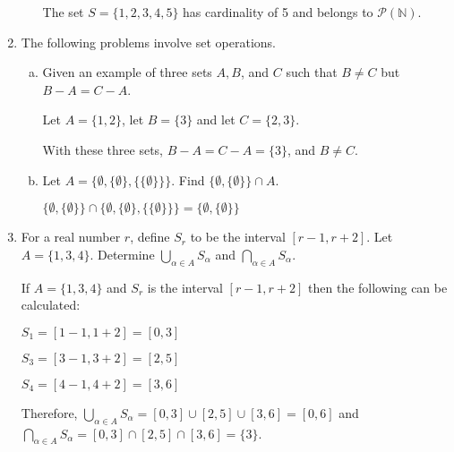 \documentclass[10pt]{article} %
\newcommand{\cP}{\mathcal{P}}
\newcommand{\N}{\mathbb{N}}
\begin{document}
\begin{enumerate}
\begin{enumerate}[(a)]
  \bigskip
  
    The set $S = \{1,2,3,4,5\}$ has cardinality of 5 and belongs to $\cP(\N)$.
  
  \bigskip
  
  \end{enumerate}

\item The following problems involve set operations.
  \begin{enumerate}[(a)]
  \item  Given an example of three sets $A, B$, and $C$ such that $B\not=C$ but $B-A=C-A$.
  
  \bigskip
  
    Let $A = \{1,2\}$, let $B = \{3\}$ and let $C = \{2,3\}$.  
  
  \noindent With these three sets, $B-A = C-A = \{3\}$, and $B \neq C$.  
  
  \bigskip
  
  \item Let $A=\{\emptyset, \{\emptyset\}, \{\{\emptyset\}\}\}$. Find $\{\emptyset, \{\emptyset\}\}\cap A$.
  
  \bigskip
  
    $\{\emptyset, \{\emptyset\}\}\cap \{\emptyset, \{\emptyset\}, \{\{\emptyset\}\}\} = \{\emptyset, \{\emptyset\}\}$
  
  \bigskip
  
  \end{enumerate}


\item For a real number $r$, define $S_r$ to be the interval $[r-1, r+2]$. Let $A=\{1, 3, 4\}$. Determine $\bigcup_{\alpha\in A} S_{\alpha}$ and $\bigcap_{\alpha\in A}S_{\alpha}$.

\bigskip

  If $A = \{1,3,4\}$ and $S_r$ is the interval $[r-1, r+2]$ then the following can be calculated:
\begin{center} $S_1 = [1-1,1+2] = [0,3]$ \end{center}
\begin{center} $S_3 = [3-1,3+2] = [2,5]$ \end{center}
\begin{center} $S_4 = [4-1,4+2] = [3,6]$ \end{center}
Therefore, $\bigcup_{\alpha\in A} S_{\alpha} = [0,3]\cup[2,5]\cup[3,6] = [0,6]$ and 
$\bigcap_{\alpha\in A}S_{\alpha} = [0,3]\cap[2,5]\cap[3,6] = \{3\}$.


\end{enumerate}
\end{document}
